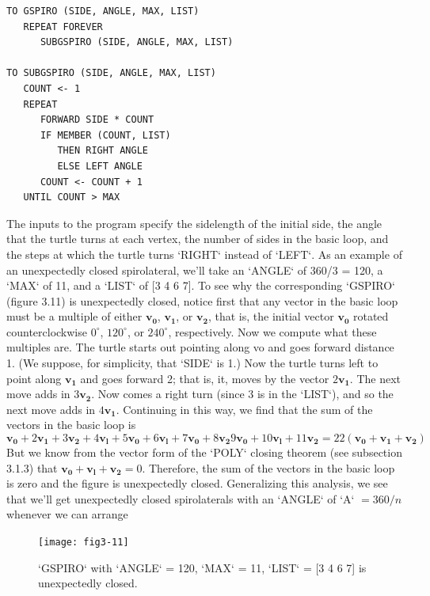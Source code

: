 \documentclass{book}
\begin{document}
\begin{verbatim}
TO GSPIRO (SIDE, ANGLE, MAX, LIST)
   REPEAT FOREVER
      SUBGSPIRO (SIDE, ANGLE, MAX, LIST)

TO SUBGSPIRO (SIDE, ANGLE, MAX, LIST)
   COUNT <- 1
   REPEAT
      FORWARD SIDE * COUNT
      IF MEMBER (COUNT, LIST)
         THEN RIGHT ANGLE
         ELSE LEFT ANGLE
      COUNT <- COUNT + 1
   UNTIL COUNT > MAX
\end{verbatim}
The inputs to the program specify the sidelength of the initial side, the
angle that the turtle turns at each vertex, the number of sides in the
basic loop, and the steps at which the turtle turns \textsc{`RIGHT`} instead of \textsc{`LEFT`}.
As an example of an unexpectedly closed spirolateral, we'll take an
\textsc{`ANGLE`} of 360/3 = 120, a \textsc{`MAX`} of 11, and a \textsc{`LIST`} of [3 4 6 7]. To
see why the corresponding \textsc{`GSPIRO`} (figure 3.11) is unexpectedly closed,
notice first that any vector in the basic loop must be a multiple of either
$\mathbf{v_0}$, $\mathbf{v_1}$, or $\mathbf{v_2}$, that is, the initial vector $\mathbf{v_0}$ rotated counterclockwise $0^{\circ}$,
$120^{\circ}$, or $240^{\circ}$, respectively. Now we compute what these multiples are.
The turtle starts out pointing along vo and goes forward distance 1. (We
suppose, for simplicity, that \textsc{`SIDE`} is 1.) Now the turtle turns left to point
along $\mathbf{v_1}$ and goes forward 2; that is, it, moves by the vector $2\mathbf{v_1}$. The
next move adds in $3\mathbf{v_2}$. Now comes a right turn (since 3 is in the \textsc{`LIST`}),
and so the next move adds in $4\mathbf{v_1}$. Continuing in this way, we find that
the sum of the vectors in the basic loop is $$\mathbf{v_0} + 2\mathbf{v_1} + 3\mathbf{v_2} + 4\mathbf{v_l} + 5\mathbf{v_0} + 6\mathbf{v_l} + 7\mathbf{v_0} + 8\mathbf{v_2}  9\mathbf{v_0} + 10\mathbf{v_l} + 11\mathbf{v_2} = 22(\mathbf{v_0} + \mathbf{v_1} + \mathbf{v_2})$$ But we know from the vector form of the \textsc{`POLY`} closing theorem (see
subsection 3.1.3) that $\mathbf{v_0} + \mathbf{v_l} + \mathbf{v_2} = 0$. Therefore, the sum of the
vectors in the basic loop is zero and the figure is unexpectedly closed.
Generalizing this analysis, we see that we'll get unexpectedly closed
spirolaterals with an \textsc{`ANGLE`} of \textsc{`A`} $= 360/n$ whenever we can arrange

\begin{figure}
\begin{center}
\texttt{[image: fig3-11]}
\caption{\textsc{`GSPIRO`} with \textsc{`ANGLE`} = 120, \textsc{`MAX`} = 11, \textsc{`LIST`} = [3 4 6 7] is unexpectedly closed.}
\end{center}
\end{figure}
\end{document}
